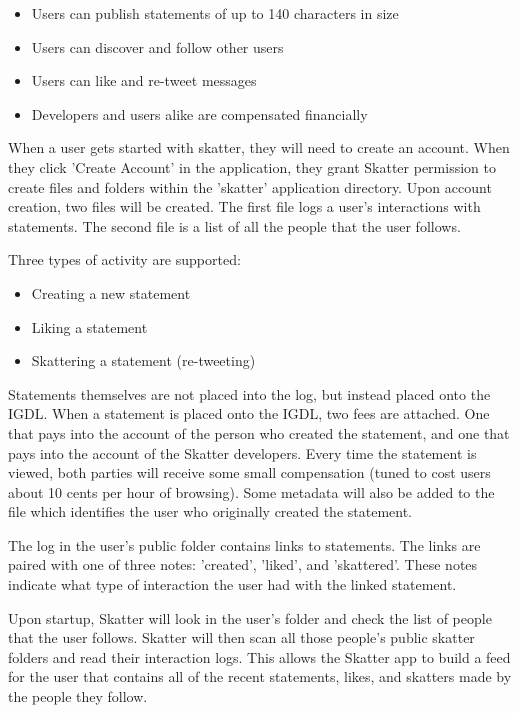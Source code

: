 \documentclass[twocolumn]{article}
\begin{document}
\begin{itemize}
	\item Users can publish statements of up to 140 characters in size
	\item Users can discover and follow other users
	\item Users can like and re-tweet messages
	\item Developers and users alike are compensated financially
\end{itemize}

When a user gets started with skatter, they will need to create an account. When
they click 'Create Account' in the application, they grant Skatter permission to
create files and folders within the 'skatter' application directory. Upon
account creation, two files will be created. The first file logs a user's
interactions with statements. The second file is a list of all the people that
the user follows.

Three types of activity are supported:

\begin{itemize}
	\item Creating a new statement
	\item Liking a statement
	\item Skattering a statement (re-tweeting)
\end{itemize}

Statements themselves are not placed into the log, but instead placed onto the
IGDL. When a statement is placed onto the IGDL, two fees are attached. One that
pays into the account of the person who created the statement, and one that pays
into the account of the Skatter developers. Every time the statement is viewed,
both parties will receive some small compensation (tuned to cost users about 10
cents per hour of browsing). Some metadata will also be added to the file which
identifies the user who originally created the statement.

The log in the user's public folder contains links to statements. The links are
paired with one of three notes: 'created', 'liked', and 'skattered'. These notes
indicate what type of interaction the user had with the linked statement.

Upon startup, Skatter will look in the user's folder and check the list of
people that the user follows. Skatter will then scan all those people's public
skatter folders and read their interaction logs. This allows the Skatter app to
build a feed for the user that contains all of the recent statements, likes, and
skatters made by the people they follow.
\end{document}
